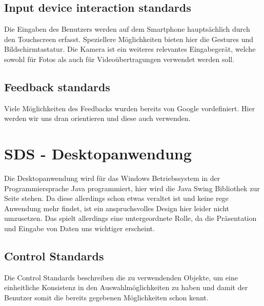 \subsection{Input device interaction standards}
Die Eingaben des Benutzers werden auf dem Smartphone hauptsächlich durch den Touchscreen erfasst. Speziellere Möglichkeiten bieten hier die Gestures und Bildschirmtastatur. Die Kamera ist ein weiteres relevantes Eingabegerät, welche sowohl für Fotos als auch für Videoübertragungen verwendet werden soll.

\subsection{Feedback standards} 
Viele Möglichkeiten des Feedbacks wurden bereits von Google vordefiniert. Hier werden wir uns dran orientieren und diese auch verwenden. 


\section{SDS - Desktopanwendung}
Die Desktopanwendung wird für das Windows Betriebssystem in der Programmiersprache Java programmiert, hier wird die Java Swing Bibliothek zur Seite stehen. Da diese allerdings schon etwas veraltet ist und keine rege Anwendung mehr findet, ist ein anspruchsvolles Design hier leider nicht umzusetzen. Das spielt allerdings eine untergeordnete Rolle, da die Präsentation und Eingabe von Daten uns wichtiger erscheint.

\subsection{Control Standards}
Die Control Standards beschreiben die zu verwendenden Objekte, um eine einheitliche Konsistenz in den Auswahlmöglichkeiten zu haben und damit der Benutzer somit die bereits gegebenen Möglichkeiten schon kennt.

\begin{table}[]
\centering
\caption{My caption}
\label{my-label}
\end{table}

